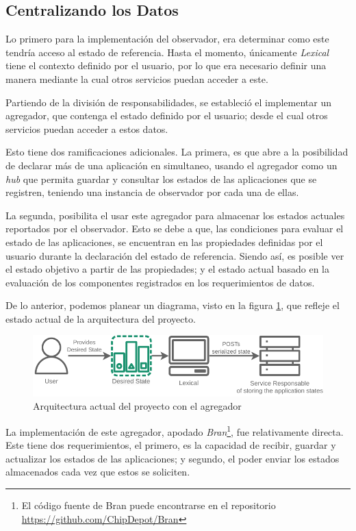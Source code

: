 \subsection{Centralizando los Datos}

Lo primero para la implementación del observador, era determinar como este tendría acceso al estado de referencia. Hasta el momento, únicamente \textit{Lexical} tiene el contexto definido por el usuario, por lo que era necesario definir una manera mediante la cual otros servicios puedan acceder a este.

Partiendo de la división de responsabilidades, se estableció el implementar un agregador, que contenga el estado definido por el usuario; desde el cual otros servicios puedan acceder a estos datos. 

Esto tiene dos ramificaciones adicionales. La primera, es que abre a la posibilidad de declarar más de una aplicación en simultaneo, usando el agregador como un \textit{hub} que permita guardar y consultar los estados de las aplicaciones que se registren, teniendo una instancia de observador por cada una de ellas.

La segunda, posibilita el usar este agregador para almacenar los estados actuales reportados por el observador. Esto se debe a que, las condiciones para evaluar el estado de las aplicaciones, se encuentran en las propiedades definidas por el usuario durante la declaración del estado de referencia. Siendo así, es posible ver el estado objetivo a partir de las propiedades; y el estado actual basado en la evaluación de los componentes registrados en los requerimientos de datos.

De lo anterior, podemos planear un diagrama, visto en la figura \ref{fig:StarDuckMini}, que refleje el estado actual de la arquitectura del proyecto.

\begin{figure}[ht]
    \centering
    \caption{Arquitectura actual del proyecto con el agregador}
    \label{fig:StarDuckMini}
    \includegraphics[width=0.9\linewidth]{images/StarDuckMini.pdf}
\end{figure}

La implementación de este agregador, apodado \textit{Bran}\footnote{El código fuente de Bran puede encontrarse en el repositorio \url{https://github.com/ChipDepot/Bran}}, fue relativamente directa. Este tiene dos requerimientos, el primero, es la capacidad de recibir, guardar y actualizar los estados de las aplicaciones; y segundo, el poder enviar los estados almacenados cada vez que estos se soliciten.

